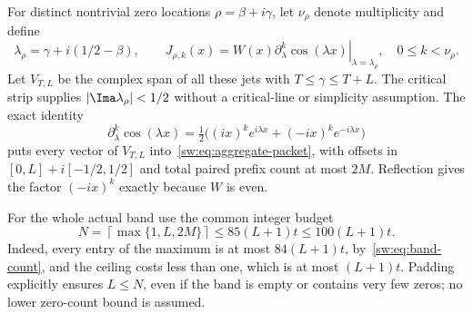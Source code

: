 \documentclass[11pt,a4paper]{article}
\numberwithin{equation}{section}
\theoremstyle{definition}\newtheorem{definition}[theorem]{Definition}
\theoremstyle{remark}\newtheorem{remark}[theorem]{Remark}
\begin{document}
For distinct nontrivial zero locations $\rho=\beta+i\gamma$, let $\nu_\rho$ denote multiplicity and define
\begin{equation}\label{sw:eq:jets}
 \lambda_\rho=\gamma+i(1/2-\beta),\qquad
 J_{\rho,k}(x)=W(x)\left.\partial_\lambda^k\cos(\lambda x)
                           \right|_{\lambda=\lambda_\rho},
 \quad0\le k<\nu_\rho.
\end{equation}
Let $V_{T,L}$ be the complex span of all these jets with $T\le\gamma\le T+L$. The critical strip supplies $|\Ima\lambda_\rho|<1/2$ without a critical-line or simplicity assumption. The exact identity
\[
 \partial_\lambda^k\cos(\lambda x)
 =\tfrac12\bigl((ix)^ke^{i\lambda x}+(-ix)^ke^{-i\lambda x}\bigr)
\]
puts every vector of $V_{T,L}$ into~\eqref{sw:eq:aggregate-packet}, with offsets in $[0,L]+i[-1/2,1/2]$ and total paired prefix count at most $2M$. Reflection gives the factor $(-ix)^k$ exactly because $W$ is even.

For the whole actual band use the common integer budget
\begin{equation}\label{sw:eq:padded-band-budget}
 N=\left\lceil\max\{1,L,2M\}\right\rceil
 \le85(L+1)t\le100(L+1)t.
\end{equation}
Indeed, every entry of the maximum is at most $84(L+1)t$, by~\eqref{sw:eq:band-count}, and the ceiling costs less than one, which is at most $(L+1)t$. Padding explicitly ensures $L\le N$, even if the band is empty or contains very few zeros; no lower zero-count bound is assumed.
\end{document}
